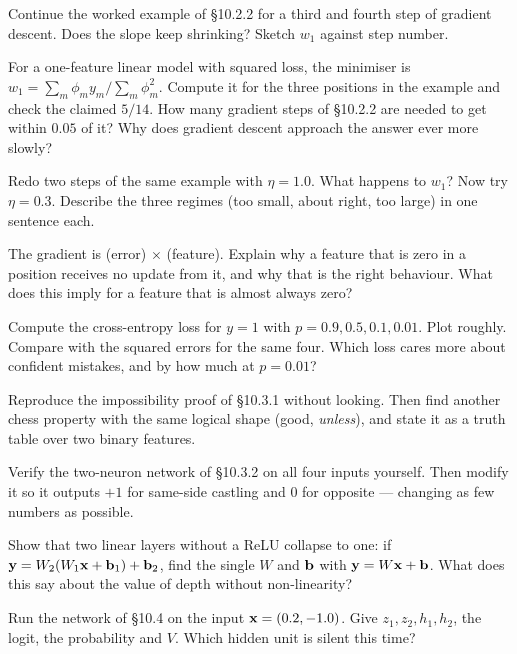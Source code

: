 \begin{exercises}

 Continue the worked example of §10.2.2 for a third and
fourth step of gradient descent. Does the slope keep shrinking? Sketch $w_1$ against step
number.

 For a one-feature linear model with squared loss, the
minimiser is $w_1 = \sum_m \phi_m y_m / \sum_m \phi_m^2$. Compute it for the three positions
in the example and check the claimed $5/14$. How many gradient steps of §10.2.2 are needed to
get within $0.05$ of it? Why does gradient descent approach the answer ever more slowly?

 Redo two steps of the same example with $\eta = 1.0$. What
happens to $w_1$? Now try $\eta = 0.3$. Describe the three regimes (too small, about right,
too large) in one sentence each.

 The gradient is (error) $\times$ (feature). Explain why
a feature that is zero in a position receives no update from it, and why that is the right
behaviour. What does this imply for a feature that is almost always zero?

 Compute the cross-entropy loss for $y = 1$ with
$p = 0.9, 0.5, 0.1, 0.01$. Plot roughly. Compare with the squared errors for the same four.
Which loss cares more about confident mistakes, and by how much at $p = 0.01$?

 Reproduce the impossibility proof of §10.3.1 without
looking. Then find another chess property with the same logical shape (good, \emph{unless}),
and state it as a truth table over two binary features.

 Verify the two-neuron network of §10.3.2 on all four
inputs yourself. Then modify it so it outputs $+1$ for same-side castling and $0$ for
opposite --- changing as few numbers as possible.

 Show that two linear layers without a ReLU collapse
to one: if $\mathbf{y} = W_2(W_1\mathbf{x} + \mathbf{b}_1) + \mathbf{b}_2$, find the single $W$ and $\mathbf{b}$
with $\mathbf{y} = W\mathbf{x} + \mathbf{b}$. What does this say about the value of depth without
non-linearity?

 Run the network of §10.4 on the input $\mathbf{x} = (0.2,
-1.0)$. Give $z_1, z_2, h_1, h_2$, the logit, the probability and $V$. Which hidden unit is
silent this time?


\end{exercises}
